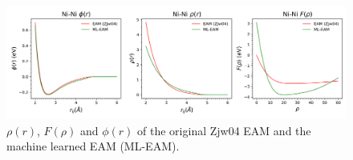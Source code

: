 \documentclass[prb,reprint]{revtex4-2}
\begin{document}
% 
%
\begin{figure}
\centering
\includegraphics[scale=0.57]{figures/Ni_eam.png}
\caption{\label{fig:Ni_eam} $\rho(r)$, $F(\rho)$ and $\phi(r)$ of the original 
Zjw04 EAM and the machine learned EAM (ML-EAM).}
\end{figure}
\end{document}
